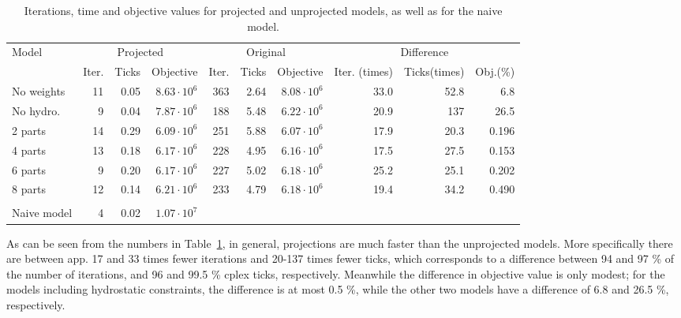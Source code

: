 \begin{table}
\centering
\begin{tabular}{l|rrr|rrr|rrr}
\toprule
Model&\multicolumn{3}{c|}{Projected}&\multicolumn{3}{c|}{Original}&\multicolumn{3}{c}{Difference}\\
&Iter.&Ticks&Objective&Iter.&Ticks&Objective&Iter. (times)&Ticks(times)&Obj.(\%)\\ %
\midrule
No weights&	11 & 0.05 & $8.63\cdot 10^6$ &	363 & 2.64&$8.08\cdot 10^6$
&33.0&52.8&6.8\\
\midrule
{No hydro.}& 9 & 0.04 &$7.87\cdot 10^6$&	188 & 5.48&$6.22 \cdot 10^6$
&20.9&137&26.5\\
\midrule
{2 parts}& 14 & 0.29 & $6.09\cdot 10^6$ &	251 & 5.88&$6.07\cdot 10^6$
&17.9&20.3&0.196\\
\midrule
{4 parts} &13 & 0.18 &$6.17\cdot 10^6$ & 228 & 4.95 &$6.16\cdot 10^6$
&17.5&27.5&0.153\\
\midrule
{6 parts} &9 & 0.20& $6.17\cdot 10^6$ &227 & 5.02 &$6.18\cdot 10^6$
&25.2&25.1&0.202\\
\midrule
{8 parts} &12 & 0.14& $6.21\cdot 10^6$ & 233 & 4.79 &$6.18\cdot 10^6$
&19.4&34.2&0.490\\
\bottomrule
\multicolumn{10}{c}{}\\
\cmidrule{1-4}
Naive model & 4 & 0.02 & $1.07\cdot 10^7$\\
\cmidrule{1-4}
\end{tabular}
\caption{Iterations, time and objective values for projected and unprojected models, as well as for the naive model. }
\label{tab:usingProjections}
\end{table}
As can be seen from the numbers in Table~\ref{tab:usingProjections}, in general, projections are much faster than the unprojected models. More specifically there are between app. 17 and 33 times fewer iterations and 20-137 times fewer ticks, which corresponds to a difference between 94 and 97 \% of the number of iterations, and 96 and 99.5 \% cplex ticks, respectively. 
Meanwhile the difference in objective value is only modest; for the models including hydrostatic constraints, the difference is at most 0.5 \%, while the other two models have a difference of 6.8 and 26.5 \%, respectively. 

